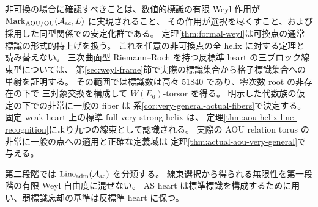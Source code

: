 非可換の場合に確認すべきことは、数値的標識の有限 Weyl 作用が
$\operatorname{Mark}_{\rm AOU/OU}(\mathcal A_{\rm ac},L)$ に実現されること、
その作用が選択を尽くすこと、および採用した同型関係での安定化群である。
定理\ref{thm:formal-weyl}は可換点の通常標識の形式的持上げを扱う。
これを任意の非可換点の全 helix に対する定理と読み替えない。
三次曲面型 Riemann--Roch を持つ反標準 heart の三ブロック線束型については、
第\ref{sec:weyl-frame}節で実際の標識集合から格子標識集合への単射を証明する。
その範囲では標識数は高々 $51840$ であり、零次数 root の非存在の下で
三対象交換を構成して $W(E_6)$-torsor を得る。
明示した代数族の仮定の下での非常に一般の fiber は
系\ref{cor:very-general-actual-fibers}で決定する。
固定 weak heart 上の標準 full very strong helix は、
定理\ref{thm:aou-helix-line-recognition}により九つの線束として認識される。
実際の AOU relation torus の非常に一般の点への適用と正確な定義域は
定理\ref{thm:actual-aou-very-general}で与える。

第二段階では $\operatorname{Line}_{\rm adm}(\mathcal A_{\rm ac})$ を分類する。
線束選択から得られる無限性を第一段階の有限 Weyl 自由度に混ぜない。
AS heart は標準標識を構成するために用い、弱標識忘却の基準は反標準 heart に保つ。
